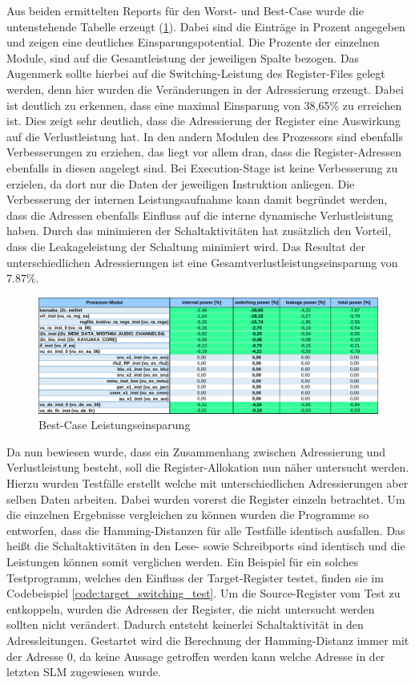 Aus beiden ermittelten Reports für den Worst- und Best-Case wurde die untenstehende Tabelle erzeugt (\ref{fig:bes_powersave}). Dabei sind die Einträge in Prozent angegeben und zeigen eine deutliches Einsparungspotential. Die Prozente der einzelnen Module, sind auf die Gesamtleistung der jeweiligen Spalte bezogen. Das Augenmerk sollte hierbei auf die Switching-Leistung des Register-Files gelegt werden, denn hier wurden die Veränderungen in der Adressierung erzeugt. Dabei ist deutlich zu erkennen, dass eine maximal Einsparung von 38,65\% zu erreichen ist. Dies zeigt sehr deutlich, dass die Adressierung der Register eine Auswirkung auf die Verlustleistung hat. In den andern Modulen des Prozessors sind ebenfalls Verbesserungen zu erziehen, das liegt vor allem dran, dass die Register-Adressen ebenfalls in diesen angelegt sind. Bei Execution-Stage ist keine Verbesserung zu erzielen, da dort nur die Daten der jeweiligen Instruktion anliegen. Die Verbesserung der internen Leistungsaufnahme kann damit begründet werden, dass die Adressen ebenfalls Einfluss auf die interne dynamische Verlustleistung haben.
Durch das minimieren der Schaltaktivitäten hat zusätzlich den Vorteil, dass die Leakageleistung der Schaltung minimiert wird. Das Resultat der unterschiedlichen Adressierungen ist eine Gesamtverlustleistungseinsparung von 7.87\%.


\begin{figure}[htbp] 
	\centering
	\includegraphics[width=\textwidth]{fig/best_worst_compare.pdf}
	\caption{Best-Case Leistungseinsparung}
	\label{fig:bes_powersave}
\end{figure}

Da nun bewiesen wurde, dass ein Zusammenhang zwischen Adressierung und Verlustleistung besteht, soll die Register-Allokation nun näher untersucht werden. Hierzu wurden Testfälle erstellt welche mit unterschiedlichen Adressierungen aber selben Daten arbeiten. Dabei wurden vorerst die Register einzeln betrachtet. Um die einzelnen Ergebnisse vergleichen zu können wurden die Programme so entworfen, dass die Hamming-Distanzen für alle Testfälle identisch ausfallen. Das heißt die Schaltaktivitäten in den Lese- sowie Schreibports sind identisch und die Leistungen können somit verglichen werden. Ein Beispiel für ein solches Testprogramm, welches den Einfluss der Target-Register testet, finden sie im Codebeispiel \ref{code:target_switching_test}. Um die Source-Register vom Test zu entkoppeln, wurden die Adressen der Register, die nicht untersucht werden sollten nicht verändert. Dadurch entsteht keinerlei Schaltaktivität in den Adressleitungen. Gestartet wird die Berechnung der Hamming-Distanz immer mit der Adresse 0, da keine Aussage getroffen werden kann welche Adresse in der letzten SLM zugewiesen wurde.

